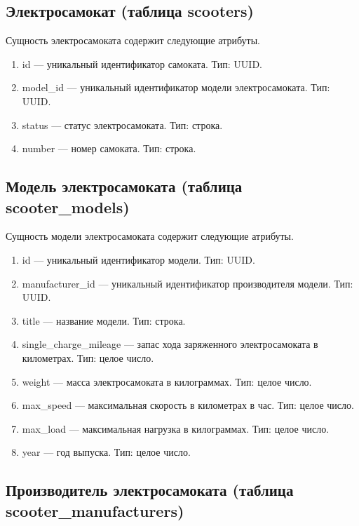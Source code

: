 \subsection*{Электросамокат (таблица scooters)}

Сущность электросамоката содержит следующие атрибуты.

\begin{enumerate}
	\item id --- уникальный идентификатор самоката. Тип: UUID.
	\item model\_id --- уникальный идентификатор модели электросамоката. Тип: UUID.
	\item status --- статус электросамоката. Тип: строка.
	\item number --- номер самоката. Тип: строка.
\end{enumerate}

\subsection*{Модель электросамоката (таблица scooter\_models)}

Сущность модели электросамоката содержит следующие атрибуты.

\begin{enumerate}
	\item id --- уникальный идентификатор модели. Тип: UUID.
	\item manufacturer\_id --- уникальный идентификатор производителя модели. Тип: UUID.
	\item title --- название модели. Тип: строка.
	\item single\_charge\_mileage --- запас хода заряженного электросамоката в
	      километрах. Тип: целое число.
	\item weight --- масса электросамоката в килограммах. Тип: целое число.
	\item max\_speed --- максимальная скорость в километрах в час. Тип: целое число.
	\item max\_load --- максимальная нагрузка в килограммах. Тип: целое число.
	\item year --- год выпуска. Тип: целое число.
\end{enumerate}

\subsection*{Производитель электросамоката (таблица scooter\_manufacturers)}


